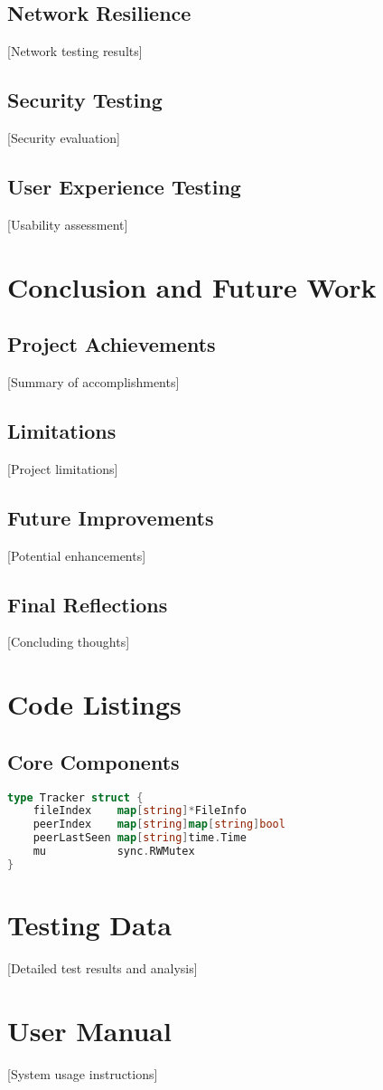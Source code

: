 \documentclass[12pt,a4paper]{report}
\begin{document}
\section{Network Resilience}
 [Network testing results]

\section{Security Testing}
 [Security evaluation]

\section{User Experience Testing}
 [Usability assessment]

\chapter{Conclusion and Future Work}
\section{Project Achievements}
 [Summary of accomplishments]

\section{Limitations}
 [Project limitations]

\section{Future Improvements}
 [Potential enhancements]

\section{Final Reflections}
 [Concluding thoughts]

\appendix
\chapter{Code Listings}
\section{Core Components}
\begin{lstlisting}[language=Go, caption=Tracker Implementation]
type Tracker struct {
    fileIndex    map[string]*FileInfo
    peerIndex    map[string]map[string]bool
    peerLastSeen map[string]time.Time
    mu           sync.RWMutex
}
\end{lstlisting}

\chapter{Testing Data}
 [Detailed test results and analysis]

\chapter{User Manual}
 [System usage instructions]

\renewcommand\bibname{References}
\begin{raggedright} %
	
	
\end{raggedright}
\end{document}
